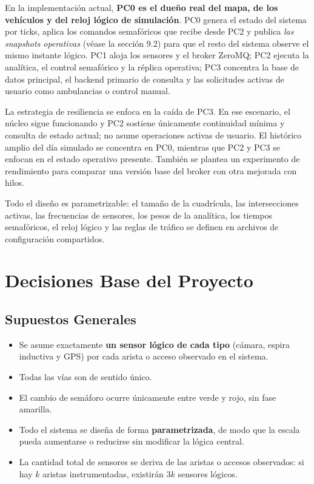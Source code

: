 \documentclass[12pt, a4paper]{article}
\let\oldtexttt\texttt
\renewcommand{\texttt}[1]{\oldtexttt{\seqsplit{#1}}}
\begin{document}
En la implementación actual, \textbf{PC0 es el dueño real del mapa, de los vehículos y del reloj lógico de simulación}. PC0 genera el estado del sistema por ticks, aplica los comandos semafóricos que recibe desde PC2 y publica \textit{las snapshots operativas} (véase la sección 9.2) para que el resto del sistema observe el mismo instante lógico. PC1 aloja los sensores y el broker ZeroMQ; PC2 ejecuta la analítica, el control semafórico y la réplica operativa; PC3 concentra la base de datos principal, el backend primario de consulta y las solicitudes activas de usuario como ambulancias o control manual.

La estrategia de resiliencia se enfoca en la caída de PC3. En ese escenario, el núcleo \texttt{PC0-PC1-PC2} sigue funcionando y PC2 sostiene únicamente continuidad mínima y consulta de estado actual; no asume operaciones activas de usuario. El histórico amplio del día simulado se concentra en PC0, mientras que PC2 y PC3 se enfocan en el estado operativo presente. También se plantea un experimento de rendimiento para comparar una versión base del broker con otra mejorada con hilos.

Todo el diseño es parametrizable: el tamaño de la cuadrícula, las intersecciones activas, las frecuencias de sensores, los pesos de la analítica, los tiempos semafóricos, el reloj lógico y las reglas de tráfico se definen en archivos de configuración compartidos.

\section{Decisiones Base del Proyecto}

\subsection{Supuestos Generales}

\begin{itemize}
    \item Se asume exactamente \textbf{un sensor lógico de cada tipo} (cámara, espira inductiva y GPS) por cada arista o acceso observado en el sistema.
    \item Todas las vías son de sentido único.
    \item El cambio de semáforo ocurre únicamente entre verde y rojo, sin fase amarilla.
    \item Todo el sistema se diseña de forma \textbf{parametrizada}, de modo que la escala pueda aumentarse o reducirse sin modificar la lógica central.
    \item La cantidad total de sensores se deriva de las aristas o accesos observados: si hay $k$ aristas instrumentadas, existirán $3k$ sensores lógicos.
\end{itemize}
\end{document}
